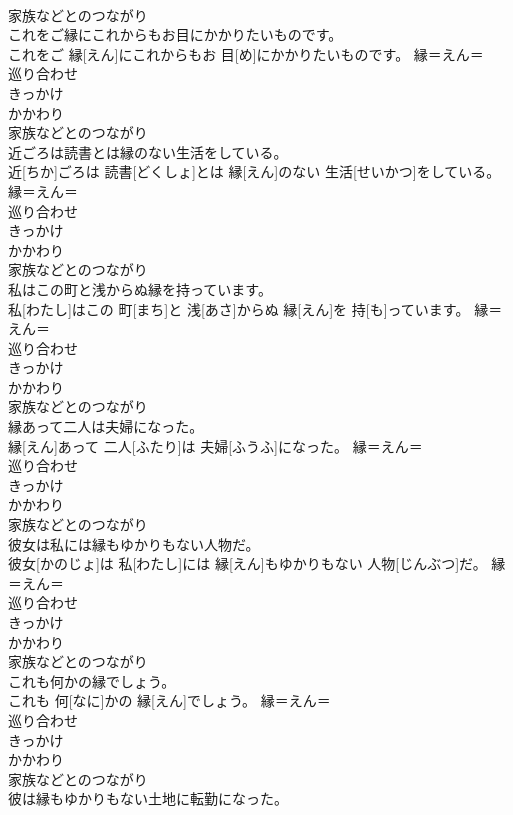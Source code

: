 \documentclass[8pt]{extreport}
\begin{document}
\begin{CJK}{UTF8}{min}
{\\	家族などとのつながり
\\	これをご縁にこれからもお目にかかりたいものです。	
\\	これをご 縁[えん]にこれからもお 目[め]にかかりたいものです。	縁＝えん＝ 
\\	巡り合わせ
\\	きっかけ
\\	かかわり
\\	家族などとのつながり
\\	近ごろは読書とは縁のない生活をしている。	
\\	近[ちか]ごろは 読書[どくしょ]とは 縁[えん]のない 生活[せいかつ]をしている。	縁＝えん＝ 
\\	巡り合わせ
\\	きっかけ
\\	かかわり
\\	家族などとのつながり
\\	私はこの町と浅からぬ縁を持っています。	
\\	私[わたし]はこの 町[まち]と 浅[あさ]からぬ 縁[えん]を 持[も]っています。	縁＝えん＝ 
\\	巡り合わせ
\\	きっかけ
\\	かかわり
\\	家族などとのつながり
\\	縁あって二人は夫婦になった。	
\\	縁[えん]あって 二人[ふたり]は 夫婦[ふうふ]になった。	縁＝えん＝ 
\\	巡り合わせ
\\	きっかけ
\\	かかわり
\\	家族などとのつながり
\\	彼女は私には縁もゆかりもない人物だ。	
\\	彼女[かのじょ]は 私[わたし]には 縁[えん]もゆかりもない 人物[じんぶつ]だ。	縁＝えん＝ 
\\	巡り合わせ
\\	きっかけ
\\	かかわり
\\	家族などとのつながり
\\	これも何かの縁でしょう。	
\\	これも 何[なに]かの 縁[えん]でしょう。	縁＝えん＝ 
\\	巡り合わせ
\\	きっかけ
\\	かかわり
\\	家族などとのつながり
\\	彼は縁もゆかりもない土地に転勤になった。	
}
\end{CJK}
\end{document}
